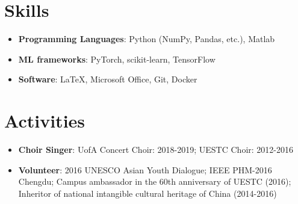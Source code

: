 \documentclass[letterpaper,11pt]{article}
\makeatletter
\newcommand{\resumeItem}[2]{
  \item\small{
    \textbf{#1}{: #2 \vspace{-2pt}}
  }
}
\newcommand{\resumeSubSubheading}[2]{
    \begin{tabular*}{0.97\textwidth}{l@{\extracolsep{\fill}}r}
      \textit{\small#1} & \textit{\small #2} \\
    \end{tabular*}\vspace{-5pt}
}
\newcommand{\resumeSubItem}[2]{\resumeItem{#1}{#2}\vspace{-4pt}}
\newcommand{\resumeSubHeadingListStart}{\begin{itemize}[leftmargin=*]}
\newcommand{\resumeSubHeadingListEnd}{\end{itemize}}
\newcommand{\resumeItemListStart}{\begin{itemize}}
\newcommand{\resumeItemListEnd}{\end{itemize}\vspace{-5pt}}
\makeatother
\begin{document}
\section{Skills}
	\resumeSubHeadingListStart
	\resumeSubItem{Programming Languages}{Python (NumPy, Pandas, etc.), Matlab}
	\resumeSubItem{ML frameworks}{PyTorch, scikit-learn, TensorFlow}
	\resumeSubItem{Software}{\LaTeX, Microsoft Office, Git, Docker}	
	\resumeSubHeadingListEnd
  
 \section{Activities}
	 \resumeSubHeadingListStart
	 \resumeSubItem{Choir Singer}{UofA Concert Choir: 2018-2019; UESTC Choir: 2012-2016}
	 \resumeSubItem{Volunteer}{2016 UNESCO Asian Youth Dialogue; IEEE PHM-2016 Chengdu; Campus ambassador in the 60th anniversary of UESTC (2016); Inheritor of national intangible cultural heritage of China (2014-2016)}
	 
	 \resumeSubHeadingListEnd
	 

  
\end{document}
